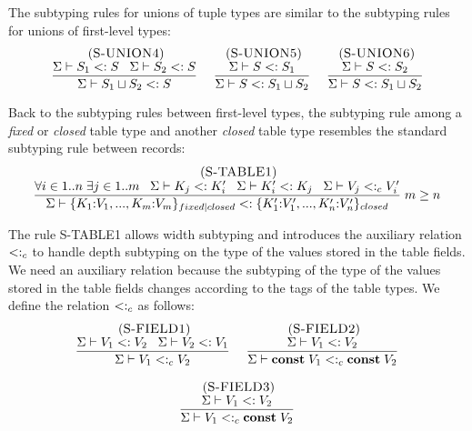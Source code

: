 The subtyping rules for unions of tuple types are similar to the
subtyping rules for unions of first-level types:
\[
\begin{array}{c}
\begin{array}{c}
\; (\textsc{S-UNION4})\\
\dfrac{\Sigma \vdash S_{1} <: S \;\;\;
       \Sigma \vdash S_{2} <: S}
      {\Sigma \vdash S_{1} \sqcup S_{2} <: S}
\end{array}
\;
\begin{array}{c}
\; (\textsc{S-UNION5})\\
\dfrac{\Sigma \vdash S <: S_{1}}
      {\Sigma \vdash S <: S_{1} \sqcup S_{2}}
\end{array}
\;
\begin{array}{c}
\; (\textsc{S-UNION6})\\
\dfrac{\Sigma \vdash S <: S_{2}}
      {\Sigma \vdash S <: S_{1} \sqcup S_{2}}
\end{array}
\end{array}
\]

Back to the subtyping rules between first-level types,
the subtyping rule among a \emph{fixed} or \emph{closed}
table type and another \emph{closed} table type resembles the
standard subtyping rule between records:
\[
\begin{array}{c}
\; (\textsc{S-TABLE1})\\
\dfrac{\forall i \in 1..n \; \exists j \in 1..m \;\;\;
       \Sigma \vdash K_{j} <: K_{i}' \;\;\;
       \Sigma \vdash K_{i}' <: K_{j} \;\;\;
       \Sigma \vdash V_{j} <:_{c} V_{i}'}
      {\Sigma \vdash \{K_{1}{:}V_{1}, ..., K_{m}{:}V_{m}\}_{fixed|closed} <:
                    \{K_{1}'{:}V_{1}', ..., K_{n}'{:}V_{n}'\}_{closed}} \; m \ge n
\end{array}
\]

The rule \textsc{S-TABLE1} allows width subtyping and introduces the
auxiliary relation $<:_{c}$ to handle depth subtyping on the
type of the values stored in the table fields.
We need an auxiliary relation because the subtyping of the
type of the values stored in the table fields changes according to
the tags of the table types.
We define the relation $<:_{c}$ as follows:
\[
\begin{array}{c}
\begin{array}{c}
\; (\textsc{S-FIELD1})\\
\dfrac{\Sigma \vdash V_{1} <: V_{2} \;\;\;
       \Sigma \vdash V_{2} <: V_{1}}
      {\Sigma \vdash V_{1} <:_{c} V_{2}}
\end{array}
\;
\begin{array}{c}
\; (\textsc{S-FIELD2})\\
\dfrac{\Sigma \vdash V_{1} <: V_{2}}
      {\Sigma \vdash \mathbf{const} \; V_{1} <:_{c} \mathbf{const} \; V_{2}}
\end{array}
\\ \\
\begin{array}{c}
\; (\textsc{S-FIELD3})\\
\dfrac{\Sigma \vdash V_{1} <: V_{2}}
      {\Sigma \vdash V_{1} <:_{c} \mathbf{const} \; V_{2}}
\end{array}
\end{array}
\]

